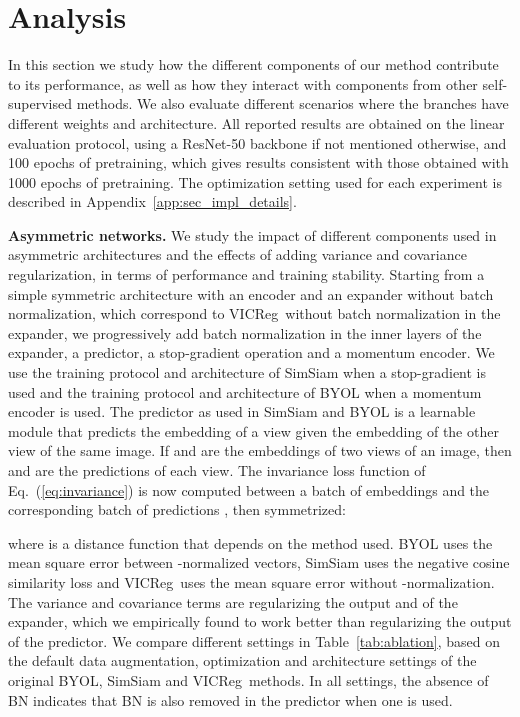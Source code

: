 \documentclass{article}
\newcommand{\algo}{VICReg}
\newcommand{\expander}{expander }
\newcommand{\expandernospace}{expander}
\begin{document}
\section{Analysis} \label{sec:ablations}
In this section we study how the different components of our method contribute to its performance, as well as how they interact with components from other self-supervised methods. We also evaluate different scenarios where the branches have different weights and architecture. All reported results are obtained on the linear evaluation protocol, using a ResNet-50 backbone if not mentioned otherwise, and 100 epochs of pretraining, which gives results consistent with those obtained with 1000 epochs of pretraining. The optimization setting used for each experiment is described in Appendix~\ref{app:sec_impl_details}.

\vspace{2mm}
\textbf{Asymmetric networks.} \label{sec:ablation_asymetric} We study the impact of different components used in asymmetric architectures and the effects of adding variance and covariance regularization, in terms of performance and training stability. Starting from a simple symmetric architecture with an encoder and an \expander without batch normalization, which correspond to \algo \ without batch normalization in the \expandernospace, we progressively add batch normalization in the inner layers of the \expandernospace, a predictor, a stop-gradient operation and a momentum encoder. We use the training protocol and architecture of SimSiam \cite{chen2020simsiam} when a stop-gradient is used and the training protocol and architecture of BYOL \cite{grill2020byol} when a momentum encoder is used. The predictor as used in SimSiam and BYOL is a learnable module  that predicts the embedding of a view given the embedding of the other view of the same image. If  and  are the embeddings of two views of an image, then  and  are the predictions of each view. The invariance loss function of Eq.~(\ref{eq:invariance}) is now computed between a batch of embeddings  and the corresponding batch of predictions , then symmetrized:

where  is a distance function that depends on the method used. BYOL uses the mean square error between -normalized vectors, SimSiam uses the negative cosine similarity loss and \algo \ uses the mean square error without -normalization. The variance and covariance terms are regularizing the output  and  of the \expandernospace, which we empirically found to work better than regularizing the output of the predictor. We compare different settings in Table~\ref{tab:ablation}, based on the default data augmentation, optimization and architecture settings of the original BYOL, SimSiam and \algo \ methods. In all settings, the absence of BN indicates that BN is also removed in the predictor when one is used.
\end{document}
